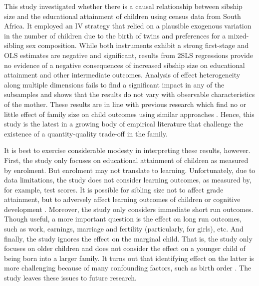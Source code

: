 This study investigated whether there is a causal relationship between sibship size and the educational attainment of children using census data from South Africa. It employed an IV strategy that relied on a plausible exogenous variation in the number of children due to the birth of twins and preferences for a mixed-sibling sex composition. While both instruments exhibit a strong first-stage and OLS estimates are negative and significant, results from 2SLS regressions provide no evidence of a negative consequences of increased sibship size on educational attainment and other intermediate outcomes. Analysis of effect heterogeneity along multiple dimensions fails to find a significant impact in any of the subsamples and shows that the results do not vary with observable characteristics of the mother. These results are in line with previous research which find no or little effect of family size on child outcomes using similar approaches \parencite[e.g.,][]{Black2005,Black2010,caceres-delpiano_impacts_2006,angrist_multiple_2010,bhalotra_twin_2020}. Hence, this study is the latest in a growing body of empirical literature that challenge the existence of a quantity-quality trade-off in the family.

It is best to exercise considerable modesty in interpreting these results, however. First, the study only focuses on educational attainment of children as measured by enrolment. But enrolment may not translate to learning. Unfortunately, due to data limitations, the study does not consider learning outcomes, as measured by, for example, test scores. It is possible for sibling size not to affect grade attainment, but to adversely affect learning outcomes of children or cognitive development \parencite{Black2010}. Moreover, the study only considers immediate short run outcomes. Though useful, a more important question is the effect on long run outcomes, such as work, earnings, marriage and fertility (particularly, for girls), etc. And finally, the study ignores the effect on the marginal child. That is, the study only focuses on older children and does not consider the effect on a younger child of being born into a larger family. It turns out that identifying effect on the latter is more challenging because of many confounding factors, such as birth order \parencite{Black2005}. The study leaves these issues to future research.  












